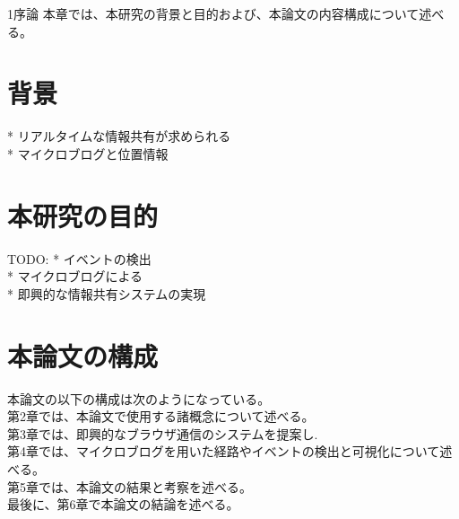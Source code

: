 \chapterhead
{1}{序論}
{本章では、本研究の背景と目的および、本論文の内容構成について述べる。}

\section{背景}

* リアルタイムな情報共有が求められる\\
* マイクロブログと位置情報\\


\newpage

\section{本研究の目的}
TODO:
* イベントの検出 \\
* マイクロブログによる \\
* 即興的な情報共有システムの実現

\newpage

\section{本論文の構成}
本論文の以下の構成は次のようになっている。\\
第2章では、本論文で使用する諸概念について述べる。\\
第3章では、即興的なブラウザ通信のシステムを提案し. \\
第4章では、マイクロブログを用いた経路やイベントの検出と可視化について述べる。\\
第5章では、本論文の結果と考察を述べる。\\
最後に、第6章で本論文の結論を述べる。\\
